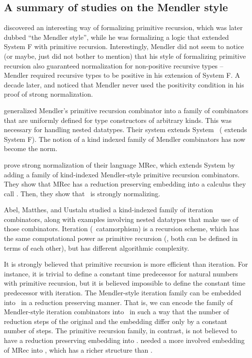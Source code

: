 \subsection{A summary of studies on the Mendler style}
\label{sec:relwork:bg}

\citet{Mendler87} discovered an interesting way of formalizing
primitive recursion, which was later dubbed ``the Mendler style'',
while he was formalizing a logic that extended System \textsf{F} with
primitive recursion. Interestingly, Mendler did not seem to notice
(or maybe, just did not bother to mention) that his style of formalizing
primitive recursion also guaranteed normalization for non-positive recursive
types -- Mendler required recursive types to be positive in his extension of
System \textsf{F}. A decade later, \citet{matthes98phd} and \citet{uustalu98phd}
noticed that Mendler never used the positivity condition in his proof of
strong normalization.

\citet{AbeMat04} generalized Mendler's primitive recursion combinator
\cite{Mendler87} into a family of combinators that are uniformly defined for
type constructors of arbitrary kinds. This was necessary for
handling nested datatypes. Their system extends System \Fw\ 
(\citet{Mendler87} extends System \textsf{F}). The notion
of a kind indexed family of Mendler combinators has now become the norm.

\citet{AbeMat04} prove strong normalization of their language \textsf{MRec},
which extends System \Fw by adding a family of kind-indexed Mendler-style
primitive recursion combinators. They show that \textsf{MRec} has
a reduction preserving embedding into a calculus they call \Fixw.
Then, they show that \Fixw\ is strongly normalizing.

Abel, Matthes, and Uustalu \cite{AbeMatUus03,AbeMatUus05} studied
a kind-indexed family of iteration combinators, along with examples
involving nested datatypes that make use of those combinators.
Iteration (\aka\ catamorphism) is a recursion scheme, which has the same
computational power as primitive recursion (\ie, both can be defined
in terms of each other), but has different algorithmic complexity. 

It is strongly believed that primitive recursion is more efficient than
iteration. For instance, it is trivial to define a constant time predecessor
for natural numbers with primitive recursion, but it is believed impossible
to define the constant time predecessor with iteration. The Mendler-style
iteration family can be embedded into \Fw\ in a reduction preserving manner.
That is, we can encode the family of Mendler-style iteration combinators
into \Fw\ in such a way that the number of reduction steps of the original
and the embedding differ only by a constant number of steps. The primitive
recursion family, in contrast, is not believed to have a reduction preserving
embedding into \Fw. \citet{AbeMat04} needed a more involved embedding of
\textsf{MRec} into \Fixw, which has a richer structure than \Fw.


